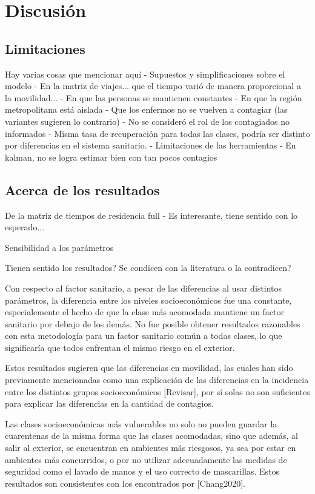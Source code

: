 \chapter{Discusión}

\section{Limitaciones}

Hay varias cosas que mencionar aquí
-  Supuestos y simplificaciones sobre el modelo
  - En la matriz de viajes... que el tiempo varió de manera proporcional a la movilidad...
  - En que las personas se mantienen constantes
  - En que la región metropolitana está aislada 
  - Que los enfermos no se vuelven a contagiar (las variantes sugieren lo contrario)
  - No se consideró el rol de los contagiados no informados
  - Misma tasa de recuperación para todas las clases, podría ser distinto por diferencias en el sistema sanitario.
- Limitaciones de las herramientas
  - En kalman, no se logra estimar bien con tan pocos contagios
  

\section{Acerca de los resultados}

De la matriz de tiempos de residencia full
  - Es interesante, tiene sentido con lo esperado...
 
Sensibilidad a los parámetros 

Tienen sentido los resultados? Se condicen con la literatura o la contradicen? 


Con respecto al factor sanitario, a pesar de las diferencias al usar distintos parámetros, la diferencia entre los niveles socioeconómicos fue una constante, especialemente el hecho de que la clase más acomodada mantiene un factor sanitario por debajo de los demás. No fue posible obtener resultados razonables con esta metodología para un factor sanitario común a todas clases, lo que significaría que todos enfrentan el mismo riesgo en el exterior.

Estos resultados sugieren que las diferencias en movilidad, las cuales han sido previamente mencionadas como una explicación de las diferencias en la incidencia entre los distintos grupos socioeconómicos \cite{Mena2021}\cite{Gozzi2021} [Revisar], por sí solas no son suficientes para explicar las diferencias en la cantidad de contagios.

Las clases socioeconómicas más vulnerables no solo no pueden guardar la cuarentenas de la misma forma que las clases acomodadas, sino que además, al salir al exterior, se encuentran en ambientes más riesgosos, ya sea por estar en ambientes más concurridos, o por no utilizar adecuadamente las medidas de seguridad como el lavado de manos y el uso correcto de mascarillas. Estos resultados son consistentes con los encontrados por \cite{}[Chang2020].

